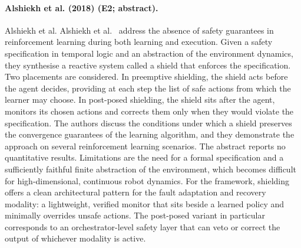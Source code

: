 \documentclass[10pt,a4paper]{article}
\begin{document}
\paragraph{Alshiekh et al. (2018) (E2; abstract).} Alshiekh et al. Alshiekh et al.~\cite{Alshiekh2018} address the absence of safety guarantees in reinforcement learning during both learning and execution. Given a safety specification in temporal logic and an abstraction of the environment dynamics, they synthesise a reactive system called a shield that enforces the specification. Two placements are considered. In preemptive shielding, the shield acts before the agent decides, providing at each step the list of safe actions from which the learner may choose. In post-posed shielding, the shield sits after the agent, monitors its chosen actions and corrects them only when they would violate the specification. The authors discuss the conditions under which a shield preserves the convergence guarantees of the learning algorithm, and they demonstrate the approach on several reinforcement learning scenarios. The abstract reports no quantitative results. Limitations are the need for a formal specification and a sufficiently faithful finite abstraction of the environment, which becomes difficult for high-dimensional, continuous robot dynamics. For the framework, shielding offers a clean architectural pattern for the fault adaptation and recovery modality: a lightweight, verified monitor that sits beside a learned policy and minimally overrides unsafe actions. The post-posed variant in particular corresponds to an orchestrator-level safety layer that can veto or correct the output of whichever modality is active.
\end{document}
